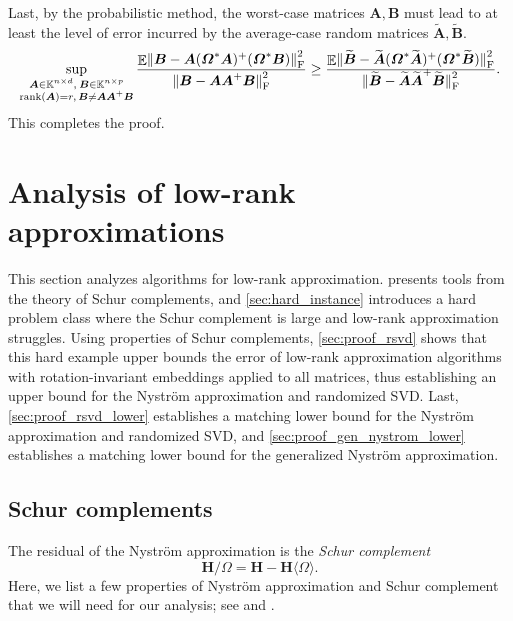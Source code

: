 \documentclass[11pt]{article}
\newcommand{\field}{\mathbb{K}}
\DeclareMathOperator{\rank}{rank}
\newcommand{\mat}[1]{\boldsymbol{#1}}
\newcommand{\norm}[1]{\mleft\| #1 \mright\|}
\DeclareMathOperator{\expect}{\mathbb{E}}
\renewcommand{\tilde}[1]{\widetilde{#1}}
\theoremstyle{definition}
\numberwithin{equation}{section}
\begin{document}
Last, by the probabilistic method, the worst-case matrices $\mat{A},\mat{B}$ must lead to at least the level of error incurred by the average-case random matrices $\mat{\tilde{A}},\mat{\tilde{B}}$.
\begin{equation*}
    \sup_{\substack{\mat{A}\in \field^{n\times d},\: \mat{B} \in \field^{n\times p} \\
    \rank(\mat{A}) = r,\,\mat{B}\neq\mat{A}\mat{A}^+\mat{B}}} \frac{\expect \norm{\smash{\mat{B} - \mat{A}(\mat{\varOmega}^*\mat{A})^+ (\mat{\varOmega}^*\mat{B})}}_{\rm F}^2}{\norm{\smash{\mat{B} - \mat{A} \mat{A}^+ \mat{B}}}_{\rm F}^2} 
    \ge \frac{\expect \norm{\smash{\tilde{\mat{B}} - \tilde{\mat{A}} (\mat{\varOmega}^* \tilde{\mat{A}})^+ (\mat{\varOmega}^* \tilde{\mat{B}})}}_{\rm F}^2}
    {\norm{\smash{\tilde{\mat{B}} - \tilde{\mat{A}} \tilde{\mat{A}}^+ \tilde{\mat{B}}}}_{\rm F}^2}.
\end{equation*}
This completes the proof.

\section{Analysis of low-rank approximations} \label{sec:rsvd-nystom-analysis}

This section analyzes algorithms for low-rank approximation.
 presents tools from the theory of Schur complements, and \cref{sec:hard_instance} introduces a hard problem class where the Schur complement is large and low-rank approximation struggles.
Using properties of Schur complements, \cref{sec:proof_rsvd} shows that this hard example upper bounds the error of low-rank approximation algorithms with rotation-invariant embeddings applied to all matrices, thus establishing an upper bound for the Nystr\"om approximation and randomized SVD.
Last,
\cref{sec:proof_rsvd_lower} establishes a matching lower bound for the Nystr\"om approximation and randomized SVD, and \cref{sec:proof_gen_nystrom_lower} establishes a matching lower bound for the generalized Nystr\"om approximation.

\subsection{Schur complements}
\label{sec:schur}

The residual of the Nystr\"om approximation is the \emph{Schur complement}
%
\begin{equation*}
    \mat{H} / \mat{\varOmega} = \mat{H} - \mat{H}\langle \mat{\varOmega}\rangle.
\end{equation*}
%
Here, we list a few properties of Nystr\"om approximation and Schur complement that we will need for our analysis; see \cite[sec.~1.5]{Bha07} and \cite{And05}.
\end{document}
